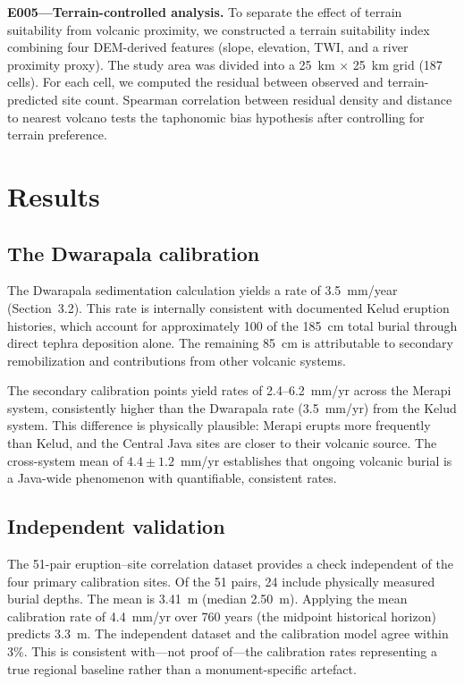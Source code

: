 \documentclass[12pt,a4paper]{article}
\begin{document}
\textbf{E005---Terrain-controlled analysis.} To separate the effect of terrain suitability from volcanic proximity, we constructed a terrain suitability index combining four DEM-derived features (slope, elevation, TWI, and a river proximity proxy). The study area was divided into a 25~km $\times$ 25~km grid (187 cells). For each cell, we computed the residual between observed and terrain-predicted site count. Spearman correlation between residual density and distance to nearest volcano tests the taphonomic bias hypothesis after controlling for terrain preference.

\section{Results}

\subsection{The Dwarapala calibration}

The Dwarapala sedimentation calculation yields a rate of 3.5~mm/year (Section~3.2). This rate is internally consistent with documented Kelud eruption histories, which account for approximately 100 of the 185~cm total burial through direct tephra deposition alone. The remaining 85~cm is attributable to secondary remobilization and contributions from other volcanic systems.

The secondary calibration points yield rates of 2.4--6.2~mm/yr across the Merapi system, consistently higher than the Dwarapala rate (3.5~mm/yr) from the Kelud system. This difference is physically plausible: Merapi erupts more frequently than Kelud, and the Central Java sites are closer to their volcanic source. The cross-system mean of $4.4 \pm 1.2$~mm/yr establishes that ongoing volcanic burial is a Java-wide phenomenon with quantifiable, consistent rates.

\subsection{Independent validation}

The 51-pair eruption--site correlation dataset provides a check independent of the four primary calibration sites. Of the 51 pairs, 24 include physically measured burial depths. The mean is 3.41~m (median 2.50~m). Applying the mean calibration rate of 4.4~mm/yr over 760 years (the midpoint historical horizon) predicts 3.3~m. The independent dataset and the calibration model agree within 3\%. This is consistent with---not proof of---the calibration rates representing a true regional baseline rather than a monument-specific artefact.
\end{document}
